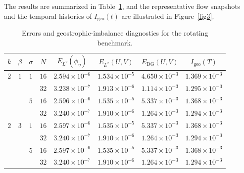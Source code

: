 \documentclass[pdflatex,sn-mathphys-num]{sn-jnl}%
\theoremstyle{thmstyleone}%
\theoremstyle{thmstyletwo}%
\theoremstyle{thmstylethree}%
\begin{document}
The results are summarized in Table~\ref{tab5}, and the representative flow snapshots and the temporal histories of $I_{\mathrm{geo}}(t)$ are illustrated in Figure~\ref{fig3}.

\begin{table}[htbp]
\centering
\caption{Errors and geostrophic-imbalance diagnostics for the rotating benchmark.}
\label{tab5}
\begin{tabular}{cccccccc}
\toprule
$k$ & $\beta$ & $\sigma$ & $N$ & $E_{L^2}(\phi_\eta)$ & $E_{L^2}(U,V)$ & $E_{\mathrm{DG}}(U,V)$ & $I_{\mathrm{geo}}(T)$ \\
\midrule
$2$ & $1$ & $1$ & $16$ & $2.594 \times 10^{-6}$ & $1.534 \times 10^{-5}$ & $4.650 \times 10^{-3}$ & $1.369 \times 10^{-3}$ \\
 &  &  & 
 $32$ & $3.238 \times 10^{-7}$ & $1.913 \times 10^{-6}$ & $1.114 \times 10^{-3}$ & $1.295 \times 10^{-3}$\\
  &  & $5$ & $16$ & $2.596 \times 10^{-6}$ & $1.535 \times 10^{-5}$ & $5.337 \times 10^{-3}$ & $1.368 \times 10^{-3}$ \\
 &  &  & 
 $32$ & $3.240 \times 10^{-7}$ & $1.910 \times 10^{-6}$ & $1.264 \times 10^{-3}$ & $1.294 \times 10^{-3}$\\
 $2$ & $3$ & $1$ & $16$ & $2.597 \times 10^{-6}$ & $1.535 \times 10^{-5}$ & $5.337 \times 10^{-3}$ & $1.368 \times 10^{-3}$ \\
 &  &  & 
 $32$ & $3.240 \times 10^{-7}$ & $1.910 \times 10^{-6}$ & $1.264 \times 10^{-3}$ & $1.294 \times 10^{-3}$\\
  &  & $5$ & $16$ & $2.597 \times 10^{-6}$ & $1.535 \times 10^{-5}$ & $5.337 \times 10^{-3}$ & $1.368 \times 10^{-3}$ \\
 &  &  & 
 $32$ & $3.240 \times 10^{-7}$ & $1.910 \times 10^{-6}$ & $1.264 \times 10^{-3}$ & $1.294 \times 10^{-3}$\\
\bottomrule
\end{tabular}
\end{table}
\end{document}
